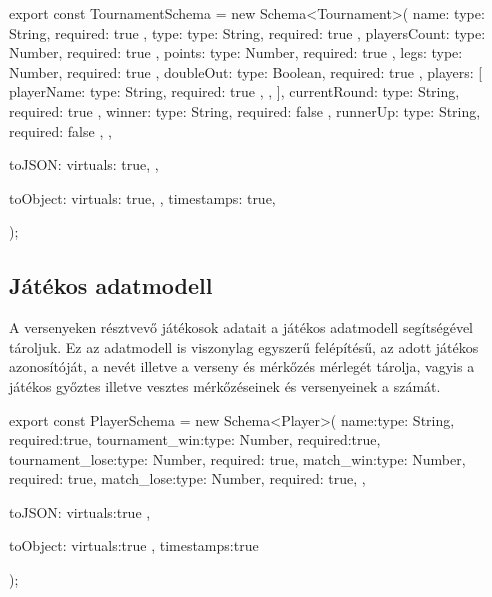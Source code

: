 \begin{cpp}
export const TournamentSchema = new Schema<Tournament>(
  {
    name: { type: String, required: true },
    type: { type: String, required: true },
    playersCount: { type: Number, required: true },
    points: { type: Number, required: true },
    legs: { type: Number, required: true },
    doubleOut: { type: Boolean, required: true },
    players: [
      {
        playerName: { type: String, required: true },
      },
    ],
    currentRound: { type: String, required: true },
    winner: { type: String, required: false },
    runnerUp: { type: String, required: false },
  },
  {
    toJSON: {
      virtuals: true,
    },

    toObject: {
      virtuals: true,
    },
    timestamps: true,
  }
);
\end{cpp}

\subsection{Játékos adatmodell}
A versenyeken résztvevő játékosok adatait a játékos adatmodell segítségével tároljuk. Ez az adatmodell is viszonylag egyszerű felépítésű, az adott játékos azonosítóját, a nevét illetve a verseny és mérkőzés mérlegét tárolja, vagyis a játékos győztes illetve vesztes mérkőzéseinek és versenyeinek a számát.

\begin{cpp}
export const PlayerSchema = new Schema<Player>(
    {
        name:{type: String, required:true},
        tournament_win:{type: Number, required:true},
        tournament_lose:{type: Number, required: true},
        match_win:{type: Number, required: true},
        match_lose:{type: Number, required: true},
    },{
        toJSON:{
            virtuals:true
        },

        toObject:{
            virtuals:true
        },
        timestamps:true
    }
);
\end{cpp}

